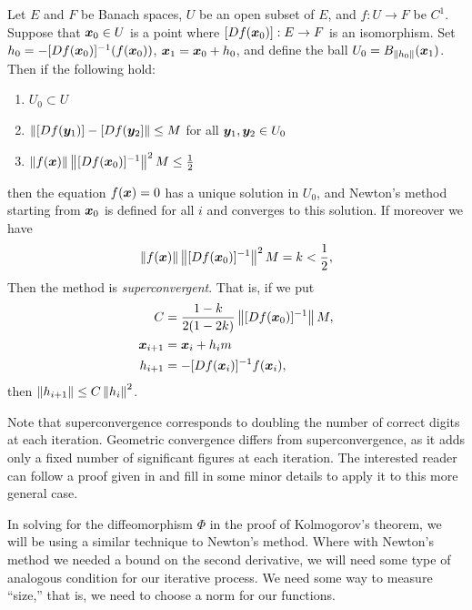 \documentclass[twoside,letterpaper,10pt]{article}
\numberwithin{equation}{section}
\begin{document}
\begin{thm}[Kantorovitch]
  Let $E$ and $F$ be Banach spaces, $U$ be an open subset of $E$, and $f : U \to
  F$ be $C^1$.
  Suppose that $\bm{x}_0 \in U$ is a point where $[\mathop{}\!D f(\bm{x}_0)] : E \to F$
  is an isomorphism.
  Set $h_0 = -[\mathop{}\!D f(\bm{x}_0)]^{-1}(f(\bm{x}_0))$, $\bm{x}_1 = \bm{x}_0 +
  h_0$, and define the ball $U_0 = B_{\norm{h_0}}(\bp{x}_1)$.
  Then if the following hold:
  \begin{enumerate}
  \item $U_0 \subset U$
  \item $\norm{[\Dif f(\bp{y}_1)] - [\Dif f(\bp{y}_2]} \leq M$ for all
    $\bm{y}_1, \bm{y}_2 \in U_0$
  \item $\norm{f(\bp{x})} \norm{[\Dif f(\bp{x}_0)]^{-1}}^2 M \leq \frac{1}{2}$
  \end{enumerate}
  then the equation $f(\bm{x}) = 0$ has a unique solution in $U_0$, and Newton's
  method starting from $\bm{x}_0$ is defined for all $i$ and converges to this
  solution.
  If moreover we have
  \begin{equation*}
    \norm{f(\bp{x})} \norm{[\Dif f(\bp{x}_0)]^{-1}}^2 M = k < \frac{1}{2},
  \end{equation*}
  Then the method is \emph{superconvergent}.
  That is, if we put
  \begin{align*}
    C &= \frac{1 - k}{2(1 - 2k)}\norm{[\Dif f(\bp{x}_0)]^{-1}} M,\\
    \bp{x}_{i+1} &= \bp{x}_i + h_im\\
    h_{i+1} &= -[\Dif f(\bp{x}_i)]^{-1} f(\bp{x}_i),
  \end{align*}
  then $\norm{h_{i+1}} \leq C \norm{h_i}^2$.
\end{thm}
Note that superconvergence corresponds to doubling the number of correct digits
at each iteration.
Geometric convergence differs from superconvergence, as it adds only a fixed
number of significant figures at each iteration.
The interested reader can follow a proof given in \cite{hh09} and fill in some
minor details to apply it to this more general case.

In solving for the diffeomorphism $\Phi$ in the proof of Kolmogorov's theorem,
we will be using a similar technique to Newton's method.
Where with Newton's method we needed a bound on the second derivative, we will
need some type of analogous condition for our iterative process.
We need some way to measure ``size,'' that is, we need to choose a norm for our
functions.
\end{document}

